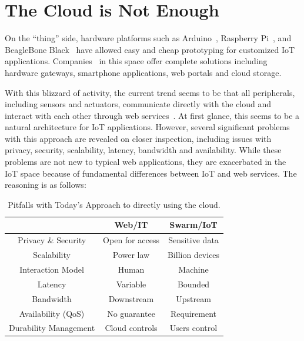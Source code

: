 \section{The Cloud is Not Enough}
\label{sec:cloud-not-enough}

On the ``thing'' side, hardware platforms such as Arduino~\cite{arduino},
Raspberry Pi~\cite{rpi}, and BeagleBone Black~\cite{bbb} have allowed easy and
cheap prototyping for customized IoT applications.  Companies~\cite{ninja,
  smartthings, wink} in this space offer complete solutions including hardware
gateways, smartphone applications, web portals and cloud storage.

With this blizzard of activity, the current trend seems to be that all
peripherals, including sensors and actuators, communicate directly with the
cloud and interact with each other through web services~\cite{lee2014swarm}.  At
first glance, this seems to be a natural architecture for IoT applications.
However, several significant problems with this approach are revealed on closer
inspection, including issues with privacy, security, scalability, latency,
bandwidth and availability.  While these problems are not new to typical web
applications, they are exacerbated in the IoT space because of fundamental
differences between IoT and web services. The reasoning is as follows:

\begin{table}
  \centering
  \begin{tabular}{c c c}
    \toprule
    & Web/IT & Swarm/IoT \\
    \midrule
    Privacy \& Security & Open for access & Sensitive data \\
    Scalability & Power law & Billion devices \\
    Interaction Model & Human & Machine \\
    Latency & Variable & Bounded  \\
    Bandwidth & Downstream & Upstream   \\
    Availability (QoS) & No guarantee & Requirement  \\
    Durability Management & Cloud controls & Users control \\
    \bottomrule
  \end{tabular}
  \caption{Pitfalls with Today's Approach to directly using the cloud.}
\end{table}

